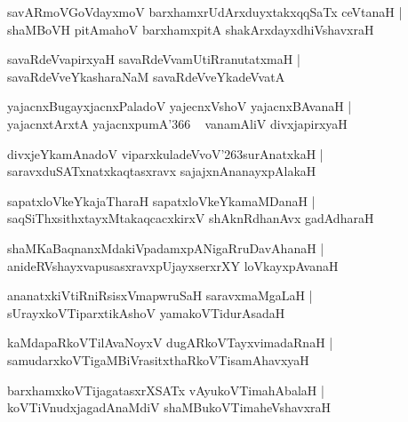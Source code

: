 \documentclass[twoside,12pt,openright]{book}
\def\S{\char'263}
\newcounter{shloka}[chapter]
\begin{document}
\begin{shloka}%
savARmoVGoVdayxmoV barxhamxrUdArxduyxtakxqqSaTx ceVtanaH |\\
shaMBoVH pitAmahoV barxhamxpitA shakArxdayxdhiVshavxraH 
\end{shloka}

\begin{shloka}%
savaRdeVvapirxyaH savaRdeVvamUtiRranutatxmaH |\\
savaRdeVveYkasharaNaM savaRdeVveYkadeVvatA 
\end{shloka}

\begin{shloka}%
yajacnxBugayxjacnxPaladoV yajecnxVshoV yajacnxBAvanaH |\\
yajacnxtArxtA yajacnxpumA\char'366 ~ vanamAliV divxjapirxyaH
\end{shloka}

\begin{shloka}%
divxjeYkamAnadoV viparxkuladeVvoV\S surAnatxkaH |\\
saravxduSATxnatxkaqtasxravx sajajxnAnanayxpAlakaH 
\end{shloka}

\begin{shloka}%
sapatxloVkeYkajaTharaH sapatxloVkeYkamaMDanaH |\\
saqSiThxsithxtayxMtakaqcacxkirxV shAknRdhanAvx gadAdharaH
\end{shloka}

\begin{shloka}%
shaMKaBaqnanxMdakiVpadamxpANigaRruDavAhanaH |\\
anideRVshayxvapusasxravxpUjayxserxrXY loVkayxpAvanaH
\end{shloka}

\begin{shloka}%
ananatxkiVtiRniRsisxVmapwruSaH saravxmaMgaLaH |\\
sUrayxkoVTiparxtikAshoV yamakoVTidurAsadaH
\end{shloka}

\begin{shloka}%
kaMdapaRkoVTilAvaNoyxV dugARkoVTayxvimadaRnaH |\\
samudarxkoVTigaMBiVrasitxthaRkoVTisamAhavxyaH
\end{shloka}

\begin{shloka}%
barxhamxkoVTijagatasxrXSATx vAyukoVTimahAbalaH |\\
koVTiVnudxjagadAnaMdiV shaMBukoVTimaheVshavxraH 
\end{shloka}
\end{document}
